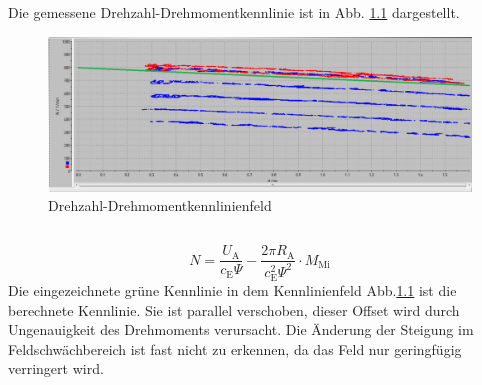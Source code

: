\chapter{}\label{ex:aufg5}
%
\section{}\label{sec:aufg5a}
%
Die gemessene Drehzahl-Drehmomentkennlinie ist in Abb. \ref{fig:drehzahldrehmoment} dargestellt.
\begin{figure}[htb]
\centering
\includegraphics[width=\textwidth]{./Bilder/Drehzahl_Drehmoment_Kennlinie_inkl_Berechnet}
\caption{Drehzahl-Drehmomentkennlinienfeld}
\label{fig:drehzahldrehmoment}
\end{figure}
\section{}\label{sec:aufg5b}
%
\begin{equation}
N = \frac{U_\text{A}}{c_\text{E}\Psi} - \frac{2\pi R_\text{A}}{c_\text{E}^2\Psi^2} \cdot M_{\text{Mi}}
\end{equation}
Die eingezeichnete grüne Kennlinie in dem Kennlinienfeld Abb.\ref{fig:drehzahldrehmoment} ist die berechnete Kennlinie. Sie ist parallel verschoben, dieser Offset wird durch Ungenauigkeit des Drehmoments verursacht. Die Änderung der Steigung im Feldschwächbereich ist fast nicht zu erkennen, da das Feld nur geringfügig verringert wird.
\clearpage
